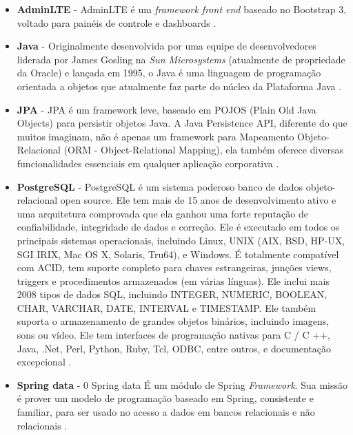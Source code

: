 \documentclass[a4paper,12pt]{monografia}
\begin{document}
\begin{itemize}
\item \textbf{AdminLTE} - AdminLTE é um \textit{framework front end} baseado no Bootstrap 3, voltado para painéis de controle e dashboards \cite{adminlte}. 

\item \textbf{Java} - Originalmente desenvolvida por uma equipe de desenvolvedores liderada por James Gosling na \textit{Sun Microsystems} (atualmente de propriedade da Oracle) e lançada em 1995, o Java é uma linguagem de programação orientada a objetos que atualmente faz parte do núcleo da Plataforma Java \cite{java}.

\item \textbf{JPA} - JPA é um framework leve, baseado em POJOS (Plain Old Java Objects) para persistir objetos Java. A Java Persistence API, diferente do que muitos imaginam, não é apenas um framework para Mapeamento Objeto-Relacional (ORM - Object-Relational Mapping), ela também oferece diversas funcionalidades essenciais em qualquer aplicação corporativa \cite{medeiros}.

\item \textbf{PostgreSQL} - PostgreSQL é um sistema poderoso banco de dados objeto-relacional open source. Ele tem mais de 15 anos de desenvolvimento ativo e uma arquitetura comprovada que ela ganhou uma forte reputação de confiabilidade, integridade de dados e correção. Ele é executado em todos os principais sistemas operacionais, incluindo Linux, UNIX (AIX, BSD, HP-UX, SGI IRIX, Mac OS X, Solaris, Tru64), e Windows. É totalmente compatível com ACID, tem suporte completo para chaves estrangeiras, junções views, triggers e procedimentos armazenados (em várias línguas). Ele inclui mais 2008 tipos de dados SQL, incluindo INTEGER, NUMERIC, BOOLEAN, CHAR, VARCHAR, DATE, INTERVAL e TIMESTAMP. Ele também suporta o armazenamento de grandes objetos binários, incluindo imagens, sons ou vídeo. Ele tem interfaces de programação nativas para C / C ++, Java, .Net, Perl, Python, Ruby, Tcl, ODBC, entre outros, e documentação excepcional \cite{postgresql}.

\item \textbf{Spring data} - 0 Spring data É um módulo de Spring \textit{Framework}. Sua missão é prover um modelo de programação baseado em Spring, consistente e familiar, para ser usado no acesso a dados em bancos relacionais e não relacionais \cite{springdata}.

\end{itemize}

\end{document}
